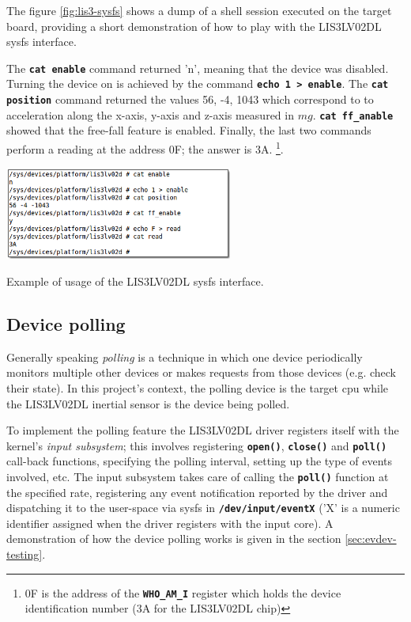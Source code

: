 \documentclass[a4paper,10pt]{article}
\makeatletter
\newenvironment{figurehere}{\def\@captype{figure}\vspace{2ex}}{\vspace{2ex}}
\newcommand{\keyword}[1]{\texttt{\textbf{#1}}}
\makeatother
\begin{document}
\begin{multicols}{2}
The figure \ref{fig:lis3-sysfs} shows a
dump of a shell session executed on the target board, providing a short
demonstration of how to play with the LIS3LV02DL sysfs interface.

The \keyword{cat enable} command returned 'n', meaning that the device was
disabled.
Turning the device on is achieved by the command \keyword{echo 1 > enable}.
The \keyword{cat position} command returned the values 56, -4, 1043 which
correspond to to acceleration along the x-axis, y-axis and z-axis measured
in $mg$. \keyword{cat ff\_anable} showed that the free-fall feature is enabled.
Finally, the last two commands perform a reading at the address 0F; the answer
is 3A.
\footnote{0F is the address of the \keyword{WHO\_AM\_I} register which holds
the device identification number (3A for the LIS3LV02DL chip)}.

\begin{figurehere}
 \centering
 \includegraphics[width=7.5cm]{./figures/dump-lis3lv02d-sysfs.png}
 \caption{Example of usage of the LIS3LV02DL sysfs interface.}
 \label{fig:lis3-sysfs}
\end{figurehere}


\subsection{Device polling}
\label{sec:lis3_poll}

Generally speaking \emph{polling} is a technique in which one device periodically
monitors multiple other devices or makes requests from those devices (e.g. check
their state). In this project's context, the polling device is the target
cpu while the LIS3LV02DL inertial sensor is the device being polled.

To implement the polling feature the LIS3LV02DL driver registers itself with the
kernel's \emph{input subsystem}; this involves registering \keyword{open()},
\keyword{close()} and \keyword{poll()} call-back functions, specifying
the polling interval, setting up the type of events involved, etc.
The input subsystem takes care of calling the \keyword{poll()} function at the
specified rate, registering any event notification reported by the driver and
dispatching it to the user-space via sysfs in
\keyword{/dev/input/eventX} ('X' is a numeric identifier assigned when the
driver registers with the input core).
A demonstration of how the device polling works is given in the section
\ref{sec:evdev-testing}.


\end{multicols}
\end{document}
